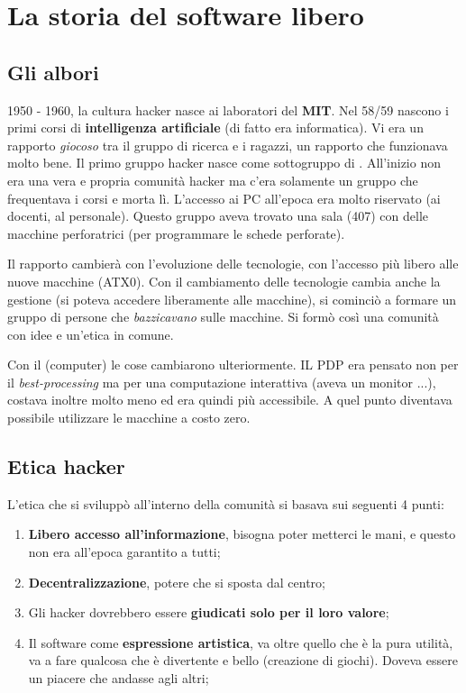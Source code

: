 \section{La storia del software libero}

\subsection{Gli albori}

1950 - 1960, la cultura hacker nasce ai laboratori del \textbf{MIT}. Nel 58/59 nascono i primi corsi di \textbf{intelligenza artificiale} (di fatto era informatica). Vi era un rapporto \textit{giocoso} tra il gruppo di ricerca e i ragazzi, un rapporto che funzionava molto bene. Il primo gruppo hacker nasce come sottogruppo di . All'inizio non era una vera e propria comunità hacker ma c'era solamente un gruppo che frequentava i corsi e morta lì. L'accesso ai PC all'epoca era molto riservato (ai docenti, al personale). Questo gruppo aveva trovato una sala (407) con delle macchine perforatrici (per programmare le schede perforate). 

Il rapporto cambierà con l'evoluzione delle tecnologie, con l'accesso più libero alle nuove macchine (ATX0). Con il cambiamento delle tecnologie cambia anche la gestione (si poteva accedere liberamente alle macchine), si cominciò a formare un gruppo di persone che \textit{bazzicavano} sulle macchine. Si formò così una comunità con idee e un'etica in comune. 

Con il  (computer) le cose cambiarono ulteriormente. IL PDP era pensato non per il \textit{best-processing} ma per una computazione interattiva (aveva un monitor ...), costava inoltre molto meno ed era quindi più accessibile. A quel punto diventava possibile utilizzare le macchine a costo zero.

\subsection{Etica hacker}

L'etica che si sviluppò all'interno della comunità si basava sui seguenti 4 punti:

\begin{enumerate}

\item \textbf{Libero accesso all'informazione}, bisogna poter metterci le mani, e questo non era all'epoca garantito a tutti;
\item \textbf{Decentralizzazione}, potere che si sposta dal centro;
\item Gli hacker dovrebbero essere \textbf{giudicati solo per il loro valore};
\item Il software come \textbf{espressione artistica}, va oltre quello che è la pura utilità, va a fare qualcosa che è divertente e bello (creazione di giochi). Doveva essere un piacere che andasse agli altri;

\end{enumerate}

